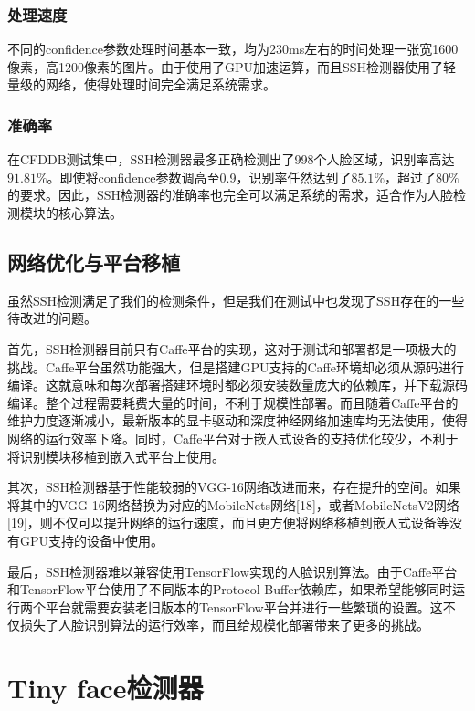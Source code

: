 \subsubsection{处理速度}

不同的confidence参数处理时间基本一致，均为230ms左右的时间处理一张宽1600像素，高1200像素的图片。由于使用了GPU加速运算，而且SSH检测器使用了轻量级的网络，使得处理时间完全满足系统需求。

\subsubsection{准确率}

在CFDDB测试集中，SSH检测器最多正确检测出了998个人脸区域，识别率高达$91.81\%$。即使将confidence参数调高至0.9，识别率任然达到了$85.1\%$，超过了$80\%$的要求。因此，SSH检测器的准确率也完全可以满足系统的需求，适合作为人脸检测模块的核心算法。

\subsection{网络优化与平台移植}

虽然SSH检测满足了我们的检测条件，但是我们在测试中也发现了SSH存在的一些待改进的问题。

首先，SSH检测器目前只有Caffe平台的实现，这对于测试和部署都是一项极大的挑战。Caffe平台虽然功能强大，但是搭建GPU支持的Caffe环境却必须从源码进行编译。这就意味和每次部署搭建环境时都必须安装数量庞大的依赖库，并下载源码编译。整个过程需要耗费大量的时间，不利于规模性部署。而且随着Caffe平台的维护力度逐渐减小，最新版本的显卡驱动和深度神经网络加速库均无法使用，使得网络的运行效率下降。同时，Caffe平台对于嵌入式设备的支持优化较少，不利于将识别模块移植到嵌入式平台上使用。

其次，SSH检测器基于性能较弱的VGG-16网络改进而来，存在提升的空间。如果将其中的VGG-16网络替换为对应的MobileNets网络[18]，或者MobileNetsV2网络[19]，则不仅可以提升网络的运行速度，而且更方便将网络移植到嵌入式设备等没有GPU支持的设备中使用。

最后，SSH检测器难以兼容使用TensorFlow实现的人脸识别算法。由于Caffe平台和TensorFlow平台使用了不同版本的Protocol Buffer依赖库，如果希望能够同时运行两个平台就需要安装老旧版本的TensorFlow平台并进行一些繁琐的设置。这不仅损失了人脸识别算法的运行效率，而且给规模化部署带来了更多的挑战。

\section{Tiny face检测器}

